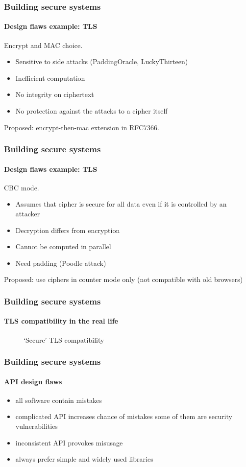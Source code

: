 \documentclass[12pt,t]{beamer}
\begin{document}
\begin{frame}
\frametitle{Building secure systems}
\framesubtitle{Design flaws example: TLS}
Encrypt and MAC choice.
\begin{itemize}
\item Sensitive to side attacks (PaddingOracle, LuckyThirteen)
\item Inefficient computation
\item No integrity on ciphertext
\item No protection against the attacks to a cipher itself
\end{itemize}
Proposed: encrypt-then-mac extension in RFC7366.
\end{frame}

\begin{frame}
\frametitle{Building secure systems}
\framesubtitle{Design flaws example: TLS}
CBC mode.
\begin{itemize}
\item Assumes that cipher is secure for all data even if it is controlled by an attacker
\item Decryption differs from encryption
\item Cannot be computed in parallel
\item Need padding (Poodle attack)
\end{itemize}
Proposed: use ciphers in counter mode only (not compatible with old browsers)
\end{frame}

\begin{frame}
\frametitle{Building secure systems}
\framesubtitle{TLS compatibility in the real life}
\begin{figure}[H]
\caption{`Secure' TLS compatibility}
\end{figure}
\end{frame}

\begin{frame}
\frametitle{Building secure systems}
\framesubtitle{API design flaws}
\begin{itemize}
\item<1-> all software contain mistakes
\item<2-> complicated API increases chance of mistakes some of them are security 
vulnerabilities
\item<3-> inconsistent API provokes misusage
\item<4-> always prefer simple and widely used libraries
\end{itemize}
\end{frame}
\end{document}
